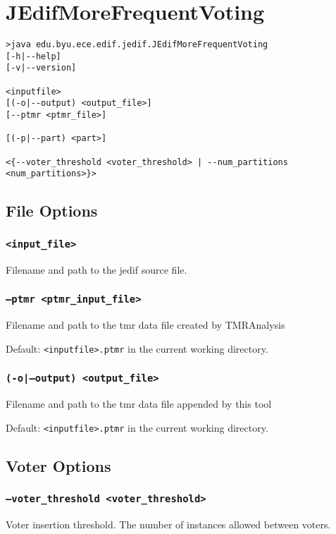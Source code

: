 \section{JEdifMoreFrequentVoting}
\begin{verbatim}
>java edu.byu.ece.edif.jedif.JEdifMoreFrequentVoting
[-h|--help] 
[-v|--version] 

<inputfile>
[(-o|--output) <output_file>] 
[--ptmr <ptmr_file>] 

[(-p|--part) <part>] 

<{--voter_threshold <voter_threshold> | --num_partitions <num_partitions>}>

\end{verbatim}

\subsection{File Options}

\subsubsection{\texttt{<input\_file>}}
Filename and path to the jedif source file.

\subsubsection{\texttt{--ptmr <ptmr\_input\_file>}}
Filename and path to the tmr data file created by TMRAnalysis

Default: \texttt{<inputfile>.ptmr} in the current working directory.

\subsubsection{\texttt{(-o|--output) <output\_file>}}
Filename and path to the tmr data file appended by this tool

Default: \texttt{<inputfile>.ptmr} in the current working directory.


\subsection{Voter Options}

\subsubsection{\texttt{--voter\_threshold <voter\_threshold>}}
Voter insertion threshold. The number of instances allowed between voters.

